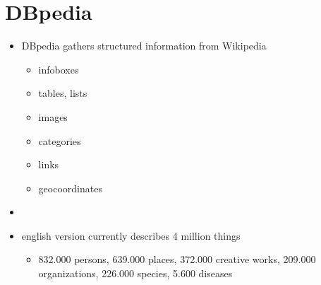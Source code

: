 \section{DBpedia}

\begin{frame}


\begin{minipage}{0.7\textwidth}
\begin{itemize}
  \item DBpedia gathers structured information from Wikipedia
	\begin{itemize}
	  \item infoboxes
	  \item tables, lists
	  \item images
	  \item categories
	  \item links
	  \item geocoordinates
	\end{itemize}
	\item
  \item english version currently describes 4 million things
  \begin{itemize}
    \item 832.000 persons, 639.000 places,
    372.000 creative works, 209.000 organizations, 226.000 species, 5.600
    diseases
    \end{itemize}
\end{itemize}
\end{minipage}
\hfill %
\begin{minipage}{0.25\textwidth}

\end{minipage}
\end{frame}
